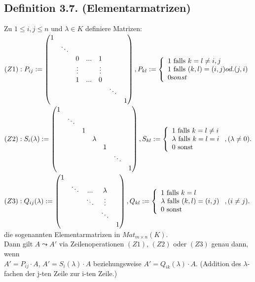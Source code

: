 \documentclass[a4paper,twoside]{article}
\newcommand{\tn}[1]{\textnormal {#1}}
\begin{document}
\subsection*{Definition 3.7. (Elementarmatrizen)}
Zu $1 \leq i,j \leq n$ und $\lambda \in K$ definiere Matrizen:\\
$(Z1): P_{ij} := \left( \begin{matrix} 
1 \\
& \ddots \\
& & 0 & ... & 1 \\
& & \vdots & & \vdots \\
& & 1 & ... & 0 \\
& & & & & \ddots \\
& & & & & & 1 \\
\end{matrix} \right), 
P_{kl} := \left \{\begin{array}{ll} 1 \tn{ falls } k = l \neq i,j \\
1 \tn{ falls } (k,l) = (i,j) od. (j,i) \\
0 \tn sonst\\
\end{array} \right.$\\
$(Z2): S_i(\lambda):= \left(\begin{matrix}
1 \\
& \ddots \\
& & 1 \\
& & & \lambda \\
& & & & 1 \\
& & & & & \ddots \\
& & & & & & 1 \\
\end{matrix} \right) ,
S_{kl} := \left \{\begin{array}{ll}
1 \tn{ falls } k = l \neq i \\
\lambda \tn{ falls } k = l = i \\
0 \tn{ sonst }
\end{array}\right. , (\lambda \neq 0).
$\\
$(Z3): Q_{ij}(\lambda) := \left(\begin{matrix}
1 \\
& \ddots & . . . & \lambda \\
& & \ddots & \vdots \\
& & &  \ddots \\
& & & &  1 \\
\end{matrix} \right) , Q_{kl} := \left \{ \begin{array}{ll}
1 \tn{ falls } k=l \\
\lambda \tn{ falls } (k,l) = (i,j)\\
0 \tn{ sonst}
\end{array} \right. , (i\neq j).
$\\
die sogenannten Elementarmatrizen in $Mat_{m \times n}(K)$.\\
Dann gilt $A \leadsto A'$ via Zeilenoperationen $(Z1)$, $(Z2)$ oder $(Z3)$ genau dann, wenn\\ 
$A' = P_{ij} \cdot A$, $A' = S_i(\lambda) \cdot A$ beziehungsweise $A' = Q_{ik}(\lambda) \cdot A$. (Addition des $\lambda$-fachen der j-ten Zeile zur i-ten Zeile.)
\end{document}
